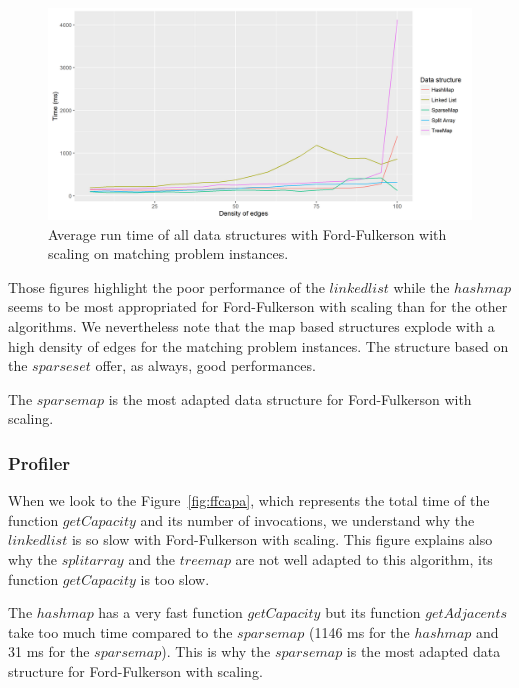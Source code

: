 \begin{figure}[H]
\begin{center}
\includegraphics[scale=0.5]{images/results/ffmeanmatching.png}
\caption{Average run time of all data structures with Ford-Fulkerson with scaling on matching problem instances.}
\label{fig:ffmeanmatching}
\end{center}
\end{figure}


Those figures highlight the poor performance of the $linked list$ while the $hash map$ seems to be most appropriated for Ford-Fulkerson with scaling than for the other algorithms. We nevertheless note that the map based structures explode with a high density of edges for the matching problem instances. The structure based on the $sparse set$ offer, as always, good performances. 

The $sparse map$ is the most adapted data structure for Ford-Fulkerson with scaling.

\subsubsection{Profiler}
When we look to the Figure~\ref{fig:ffcapa}, which represents the total time of the function $getCapacity$ and its number of invocations, we understand why the $linkedlist$ is so slow with Ford-Fulkerson with scaling. This figure explains also why the $split array$ and the $treemap$ are not well adapted to this algorithm, its function $getCapacity$ is too slow.

The $hashmap$ has a very fast function $getCapacity$ but its function $getAdjacents$ take too much time compared to the $sparsemap$ (1146 ms for the $hashmap$ and 31 ms for the $sparsemap$). This is why the $sparse map$ is the most adapted data structure for Ford-Fulkerson with scaling.


